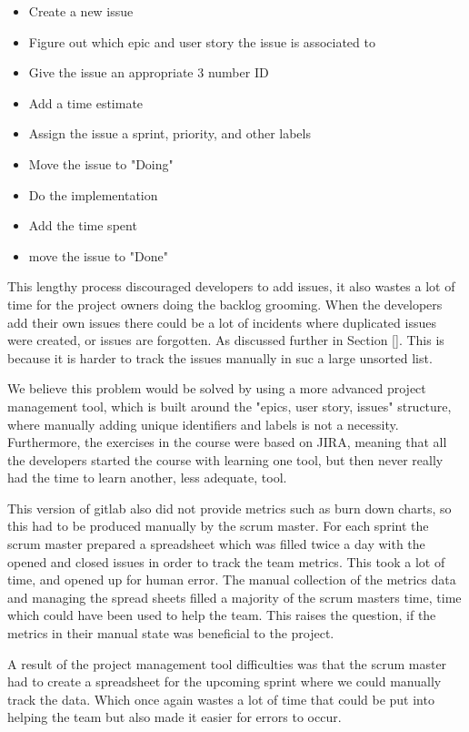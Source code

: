 \documentclass{article}
\begin{document}
\begin{itemize}
    \item Create a new issue
    \item Figure out which epic and user story the issue is associated to
    \item Give the issue an appropriate 3 number ID
    \item Add a time estimate
    \item Assign the issue a sprint, priority, and other labels
    \item Move the issue to "Doing"
    \item Do the implementation
    \item Add the time spent
    \item move the issue to "Done"
\end{itemize}

This lengthy process discouraged developers to add issues, it also wastes a lot of time for the project owners doing the backlog grooming. When the developers add their own issues there could be a lot of incidents where duplicated issues were created, or issues are forgotten. As discussed further in Section \ref{}. This is because it is harder to track the issues manually in suc a large unsorted list.

We believe this problem would be solved by using a more advanced project management tool, which is built around the "epics, user story, issues" structure, where manually adding unique identifiers and labels is not a necessity. Furthermore, the exercises in the course were based on JIRA, meaning that all the developers started the course with learning one tool, but then never really had the time to  learn another, less adequate, tool.

This version of gitlab also did not provide metrics such as burn down charts, so this had to be produced manually by the scrum master. For each sprint the scrum master prepared a spreadsheet which was filled twice a day with the opened and closed issues in order to track the team metrics. This took a lot of time, and opened up for human error. The manual collection of the metrics data and managing the spread sheets filled a majority of the scrum masters time, time which could have been used to help the team. This raises the question, if the metrics in their manual state was beneficial to the project.

A result of the project management tool difficulties was that the scrum master had to create a spreadsheet for the upcoming sprint where we could manually track the data. Which once again wastes a lot of time that could be put into helping the team but also made it easier for errors to occur.
\end{document}
